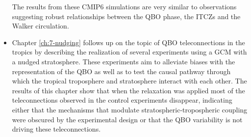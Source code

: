 \begin{itemize}
The results from these CMIP6 simulations are very similar to observations suggesting robust relationships between the QBO phase, the ITCZs and the Walker circulation.
\item Chapter \ref{ch:7-nudging} follows up on the topic of QBO teleconnections in the tropics by describing the realization of several experiments using a GCM with a nudged stratosphere. These experiments aim to alleviate biases with the representation of the QBO as well as to test the causal pathway through which the tropical troposphere and stratosphere interact with each other. 
The results of this chapter show that when the relaxation was applied most of the teleconnections observed in the control experiments disappear, indicating either that the mechanisms that modulate stratospheric-tropospheric coupling were obscured by the experimental design or that the QBO variability is not driving these teleconnections.
\end{itemize}